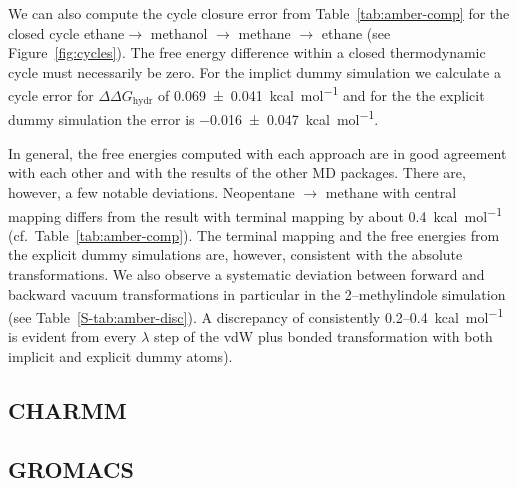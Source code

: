 \documentclass[journal=jctcce,manuscript=article]{achemso}
\begin{document}
We can also compute the cycle closure error from Table~\ref{tab:amber-comp} for the closed cycle ethane$ \rightarrow$ methanol $\rightarrow$ methane $\rightarrow$ ethane (see Figure~\ref{fig:cycles}).  The free energy difference within a closed thermodynamic cycle must necessarily be zero.  For the implict dummy simulation we calculate a cycle error for $\Delta\Delta G_\mathrm{hydr}$ of \SI{0.069+-0.041}{kcal.mol^{-1}} and for the the explicit dummy simulation the error is \SI{-0.016+-0.047}{kcal.mol^{-1}}.

In general, the free energies computed with each approach are in good agreement with each other and with the results of the other MD packages.  There are, however, a few notable deviations.  Neopentane $\rightarrow$ methane with  central mapping differs from the result with terminal mapping by about \SI{0.4}{kcal.mol^{-1}} (cf.\ Table~\ref{tab:amber-comp}).  The terminal mapping and the free energies from the explicit dummy simulations are, however, consistent with the absolute transformations.  We also observe a systematic deviation between forward and backward vacuum transformations in particular in the 2--methylindole simulation (see Table~\ref{S-tab:amber-disc}).
A discrepancy of consistently 0.2--\SI{0.4}{kcal.mol^{-1}} is evident from every $\lambda$ step of the vdW plus bonded transformation with both implicit and explicit dummy atoms).


\subsection{CHARMM}
\label{sec:charmm-results}



\subsection{GROMACS}
\label{sec:gromacs-results}



\end{document}
